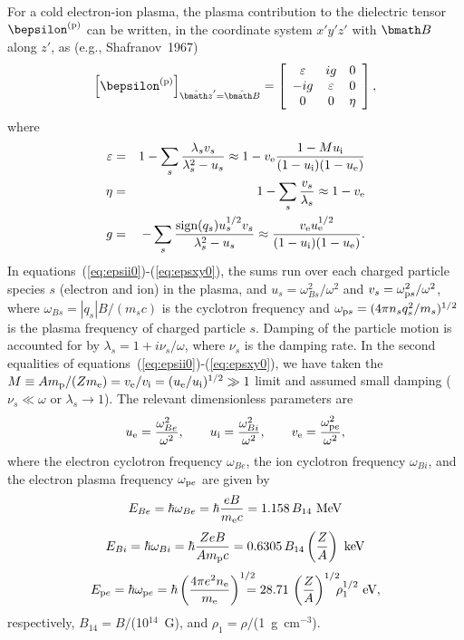 \documentclass{mn2e}
\newcommand{\be}{\begin{equation}}
\newcommand{\ee}{\end{equation}}
\newcommand{\ba}{\begin{eqnarray}}
\newcommand{\ea}{\end{eqnarray}}
\newcommand{\lp}{\left(}
\newcommand{\rp}{\right)}
\newcommand{\lb}{\left[}
\newcommand{\rb}{\right]}
\newcommand{\mpr}{m_{\rm p}}
\newcommand{\me}{m_{\rm e}}
\newcommand{\vecB}{{\bmath B}}
\newcommand{\vechatB}{\hat{\bmath B}}
\newcommand{\vechatzp}{\hat{\bmath z}'}
\newcommand{\nel}{n_{\rm e}}
\newcommand{\Ebe}{E_{Be}}
\newcommand{\omegab}{\omega_{Be}}
\newcommand{\Ebi}{E_{Bi}}
\newcommand{\omegabi}{\omega_{Bi}}
\newcommand{\Epe}{E_{{\rm p}e}}
\newcommand{\omegap}{\omega_{{\rm p}e}}
\newcommand{\uel}{u_{\rm e}}
\newcommand{\uion}{u_{\rm i}}
\newcommand{\vel}{v_{\rm e}}
\newcommand{\vion}{v_{\rm i}}
\newcommand{\lambdad}{\lambda_{s}}
\newcommand{\omegabo}{\omega_{Bs}}
\newcommand{\omegapo}{\omega_{{\rm p}s}}
\newcommand{\vecepspl}{\bepsilon^{\rm (p)}}
\begin{document}
For a cold electron-ion plasma, the plasma contribution to the
dielectric tensor $\vecepspl$ can be written, in the coordinate
system $x'y'z'$ with $\vecB$ along $z'$, as (e.g., Shafranov~1967)
\be
\lb\vecepspl\rb_{\vechatzp=\vechatB}= \lb \begin{array}{ccc}
\varepsilon & ig & 0 \\
-ig & \varepsilon & 0 \\
0 & 0 & \eta
\end{array} \rb, \label{eq:epsij0}
\ee
where
\ba
\varepsilon & = & 1-\sum_s\frac{\lambdad v_s}{\lambdad^2 - u_s}
 \approx 1-\vel\frac{1-M\uion}{(1-\uion)(1-\uel)} \label{eq:epsii0} \\
\eta & = & 1-\sum_s\frac{v_s}{\lambdad} \approx 1 - \vel \label{eq:epszz0} \\
g & = & -\sum_s\frac{\mbox{sign}(q_s)u_s^{1/2}v_s}{\lambdad^2-u_s}
 \approx \frac{\vel\uel^{1/2}}{(1-\uion)(1-\uel)}.  \label{eq:epsxy0}
\ea
In equations~(\ref{eq:epsii0})-(\ref{eq:epsxy0}), the sums run
over each charged particle species $s$ (electron and ion) in the plasma,
and $u_s = \omegabo^2/\omega^2$ and $v_s = \omegapo^2/\omega^2$, where
$\omegabo=|q_s|B/(m_s c)$ is the cyclotron frequency and
$\omegapo=(4\pi n_sq_s^2/m_s)^{1/2}$ is the plasma frequency
of charged particle $s$.
Damping of the particle motion is accounted for by
$\lambdad = 1+i\nu_s/\omega$, where $\nu_s$ is the damping rate.
In the second equalities of equations~(\ref{eq:epsii0})-(\ref{eq:epsxy0}),
we have taken the $M\equiv A\mpr/(Z\me)=\vel/\vion=(\uel/\uion)^{1/2}\gg 1$
limit and assumed small damping ($\nu_s\ll\omega$ or
$\lambdad\rightarrow 1$).  The relevant dimensionless parameters are
\be
\uel = \frac{\omegab^2}{\omega^2}, \qquad
\uion = \frac{\omegabi^2}{\omega^2}, \qquad \vel = \frac{\omegap^2}{\omega^2},
\ee
where the electron cyclotron frequency
$\omegab$, the ion cyclotron frequency $\omegabi$, and the electron
plasma frequency $\omegap$ are given by
\be
\Ebe = \hbar\omegab = \hbar\frac{eB}{\me c}
 = 1.158\,B_{14}\mbox{ MeV}
\ee
\be
\Ebi = \hbar\omegabi = \hbar\frac{ZeB}{A\mpr c}
 = 0.6305\,B_{14}\lp\frac{Z}{A}\rp\mbox{ keV} \label{eq:ioncycen}
\ee
\be
\Epe = \hbar\omegap = \hbar\lp\frac{4\pi e^2\nel}{\me}\rp^{1/2}
 \!\!\!\!\!\!  = 28.71\,\lp\frac{Z}{A}\rp^{1/2}\!\!\!\rho_1^{1/2}\mbox{ eV},
\ee
respectively, $B_{14}=B/$(10$^{14}$~G), and $\rho_1=\rho/$(1~g~cm$^{-3}$).
\end{document}
